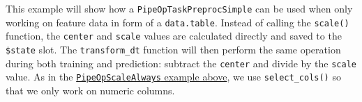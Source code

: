 \documentclass[]{article}
\newenvironment{Shaded}{\begin{snugshade}}{\end{snugshade}}
\newcommand{\ControlFlowTok}[1]{\textcolor[rgb]{0.13,0.29,0.53}{\textbf{#1}}}
\newcommand{\DataTypeTok}[1]{\textcolor[rgb]{0.13,0.29,0.53}{#1}}
\newcommand{\KeywordTok}[1]{\textcolor[rgb]{0.13,0.29,0.53}{\textbf{#1}}}
\newcommand{\NormalTok}[1]{#1}
\newcommand{\OperatorTok}[1]{\textcolor[rgb]{0.81,0.36,0.00}{\textbf{#1}}}
\newcommand{\StringTok}[1]{\textcolor[rgb]{0.31,0.60,0.02}{#1}}
\renewenvironment{Shaded} {\begin{snugshade}\small} {\end{snugshade}}
\begin{document}
This example will show how a \texttt{PipeOpTaskPreprocSimple} can be used when only working on feature data in form of a \texttt{data.table}.
Instead of calling the \texttt{scale()} function, the \texttt{center} and \texttt{scale} values are calculated directly and saved to the \texttt{\$state} slot.
The \texttt{transform\_dt} function will then perform the same operation during both training and prediction: subtract the \texttt{center} and divide by the \texttt{scale} value.
As in the \protect\hyperlink{example-pipeopscalealways}{\texttt{PipeOpScaleAlways} example above}, we use \texttt{select\_cols()} so that we only work on numeric columns.

\begin{Shaded}
\end{Shaded}
\end{document}

